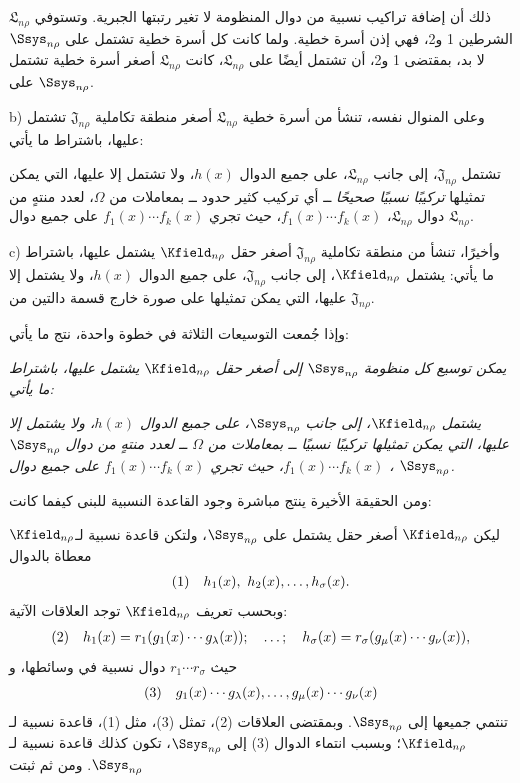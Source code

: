 \documentclass[11pt]{article}
\providecommand{\Lsys}{\mathfrak{L}}
\providecommand{\Jdom}{\mathfrak{J}}
\begin{document}
ذلك أن إضافة تراكيب نسبية من دوال المنظومة لا تغير رتبتها الجبرية. وتستوفي $\Lsys_{n\rho}$ الشرطين 1 و2، فهي إذن أسرة خطية. ولما كانت كل أسرة خطية تشتمل على $\Ssys_{n\rho}$ لا بد، بمقتضى 1 و2، أن تشتمل أيضًا على $\Lsys_{n\rho}$، كانت $\Lsys_{n\rho}$ أصغر أسرة خطية تشتمل على $\Ssys_{n\rho}$.

b) وعلى المنوال نفسه، تنشأ من أسرة خطية $\Lsys_{n\rho}$ أصغر منطقة تكاملية $\Jdom_{n\rho}$ تشتمل عليها، باشتراط ما يأتي:

تشتمل $\Jdom_{n\rho}$، إلى جانب $\Lsys_{n\rho}$، على جميع الدوال $h(x)$، ولا تشتمل إلا عليها، التي يمكن تمثيلها \emph{تركيبًا نسبيًا صحيحًا} ــ أي تركيب كثير حدود ــ بمعاملات من $\Omega$، لعدد منتهٍ من دوال $\Lsys_{n\rho}$، $f_1(x)\cdots f_k(x)$، حيث تجري $f_1(x)\cdots f_k(x)$ على جميع دوال $\Lsys_{n\rho}$.

c) وأخيرًا، تنشأ من منطقة تكاملية $\Jdom_{n\rho}$ أصغر حقل $\Kfield_{n\rho}$ يشتمل عليها، باشتراط ما يأتي: يشتمل $\Kfield_{n\rho}$، إلى جانب $\Jdom_{n\rho}$، على جميع الدوال $h(x)$، ولا يشتمل إلا عليها، التي يمكن تمثيلها على صورة خارج قسمة دالتين من $\Jdom_{n\rho}$.

وإذا جُمعت التوسيعات الثلاثة في خطوة واحدة، نتج ما يأتي:

\emph{يمكن توسيع كل منظومة $\Ssys_{n\rho}$ إلى أصغر حقل $\Kfield_{n\rho}$ يشتمل عليها، باشتراط ما يأتي:}

\emph{يشتمل $\Kfield_{n\rho}$، إلى جانب $\Ssys_{n\rho}$، على جميع الدوال $h(x)$، ولا يشتمل إلا عليها، التي يمكن تمثيلها تركيبًا نسبيًا ــ بمعاملات من $\Omega$ ــ لعدد منتهٍ من دوال $\Ssys_{n\rho}$، $f_1(x)\cdots f_k(x)$، حيث تجري $f_1(x)\cdots f_k(x)$ على جميع دوال $\Ssys_{n\rho}$.}

ومن الحقيقة الأخيرة ينتج مباشرة وجود القاعدة النسبية للبنى كيفما كانت:

ليكن $\Kfield_{n\rho}$ أصغر حقل يشتمل على $\Ssys_{n\rho}$، ولتكن قاعدة نسبية لـ$\Kfield_{n\rho}$ معطاة بالدوال
\[
\begin{array}{@{}l@{\quad}c@{}}
(1)&h_1(x),\ h_2(x),\ldots,h_\sigma(x).
\end{array}
\]
وبحسب تعريف $\Kfield_{n\rho}$ توجد العلاقات الآتية:
\[
\begin{array}{@{}l@{\quad}c@{}}
(2)&h_1(x)=r_1(g_1(x)\cdots g_\lambda(x));\quad\ldots;\quad h_\sigma(x)=r_\sigma(g_\mu(x)\cdots g_\nu(x)),
\end{array}
\]
حيث $r_1\cdots r_\sigma$ دوال نسبية في وسائطها، و
\[
\begin{array}{@{}l@{\quad}c@{}}
(3)&g_1(x)\cdots g_\lambda(x),\ldots,g_\mu(x)\cdots g_\nu(x)
\end{array}
\]
تنتمي جميعها إلى $\Ssys_{n\rho}$. وبمقتضى العلاقات (2)، تمثل (3)، مثل (1)، قاعدة نسبية لـ$\Kfield_{n\rho}$؛ وبسبب انتماء الدوال (3) إلى $\Ssys_{n\rho}$، تكون كذلك قاعدة نسبية لـ$\Ssys_{n\rho}$. ومن ثم ثبتت
\end{document}
